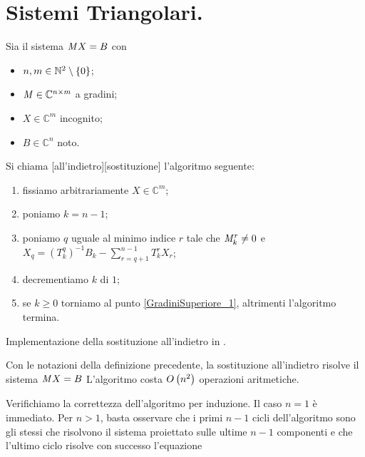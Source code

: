 \section{Sistemi Triangolari.}
\label{MetodiNumericiPerSistemiLineari_SistemiTriangolari}
\begin{Definition}
  Sia il sistema
  $\mathit{M} X = B$ con
  \begin{itemize}
    \item $n, m \in \mathbb{N}^2 \setminus \lbrace 0 \rbrace$;
    \item $\mathit{M} \in \mathbb{C}^{n \times m}$ a gradini;
    \item $X \in \mathbb{C}^m$ incognito;
    \item $B \in \mathbb{C}^n$ noto.
  \end{itemize}
  Si chiama
  [all'indietro][sostituzione]
  l'algoritmo seguente:
  \begin{enumerate}
    \item\label{GradiniSuperiore_0} fissiamo arbitrariamente
      $X \in \mathbb{C}^m$;
    \item\label{GradiniSuperiore_1} poniamo $k = n - 1$;
    \item\label{GradiniSuperiore_2} poniamo $q$ uguale al minimo indice
      $r$ tale che $\mathit{M}_k^r \neq 0$ e
      $X_q = (T_k^q)^{-1}B_k - \sum_{r = q + 1}^{n - 1} T_k^r X_r$;
    \item\label{GradiniSuperiore_3} decrementiamo $k$ di $1$;
    \item\label{GradiniSuperiore_4} se $k \geq 0$ torniamo al punto
      \ref{GradiniSuperiore_1}, altrimenti l'algoritmo termina.
  \end{enumerate}
\end{Definition}
\begin{listing}
	\caption{Implementazione della sostituzione all'indietro in .}
\end{listing}
\begin{Theorem}
  Con le notazioni della definizione precedente, la sostituzione
  all'indietro risolve il sistema $\mathit{M} X = B$
  L'algoritmo costa $O \left ( n^2 \right )$ operazioni aritmetiche.
\end{Theorem}
\Proof Verifichiamo la correttezza dell'algoritmo per induzione. Il caso $n = 1$
\`e immediato. Per $n > 1$, basta osservare che i primi $n - 1$ cicli
dell'algoritmo sono gli stessi che risolvono il sistema proiettato sulle ultime
$n - 1$ componenti e che l'ultimo ciclo risolve con successo l'equazione
